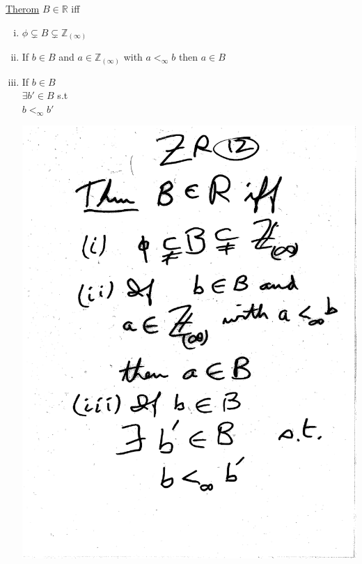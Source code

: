 \documentclass[10pt,a4paper]{article}
\begin{document}
\underline{Therom} $B \in \mathbb{R}$ iff
\begin{enumerate}[(i)] 
\item $\phi \subsetneq B \subsetneq \mathbb{Z}_{(\infty)}$ 
\item If $b \in B$ and $a \in \mathbb{Z}_{(\infty)}$ with $a <_\infty b$ then $a \in B$
\item If $b \in B$ 
\\ $\exists b' \in B$ s.t
\\ $b <_\infty b'$

\includegraphics[scale=.5]{Pages/ZR_12}
\end{enumerate}

\newpage
\end{document}
